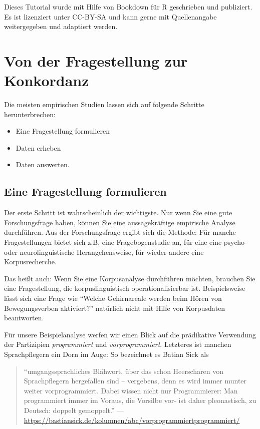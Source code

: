 \documentclass[]{article}
\providecommand{\tightlist}{%
  \setlength{\itemsep}{0pt}\setlength{\parskip}{0pt}}
\begin{document}
Dieses Tutorial wurde mit Hilfe von Bookdown für R geschrieben und
publiziert. Es ist lizenziert unter CC-BY-SA und kann gerne mit
Quellenangabe weitergegeben und adaptiert werden.

\section{Von der Fragestellung zur
Konkordanz}\label{von-der-fragestellung-zur-konkordanz}

Die meisten empirischen Studien lassen sich auf folgende Schritte
herunterbrechen:

\begin{itemize}
\tightlist
\item
  Eine Fragestellung formulieren
\item
  Daten erheben
\item
  Daten auswerten.
\end{itemize}

\subsection{Eine Fragestellung
formulieren}\label{eine-fragestellung-formulieren}

Der erste Schritt ist wahrscheinlich der wichtigste. Nur wenn Sie eine
gute Forschungsfrage haben, können Sie eine aussagekräftige empirische
Analyse durchführen. Aus der Forschungsfrage ergibt sich die Methode:
Für manche Fragestellungen bietet sich z.B. eine Fragebogenstudie an,
für eine eine psycho- oder neurolinguistische Herangehensweise, für
wieder andere eine Korpusrecherche.

Das heißt auch: Wenn Sie eine Korpusanalyse durchführen möchten,
brauchen Sie eine Fragestellung, die korpuslinguistisch
operationalisierbar ist. Beispielsweise lässt sich eine Frage wie
``Welche Gehirnareale werden beim Hören von Bewegungsverben aktiviert?''
natürlich nicht mit Hilfe von Korpusdaten beantworten.

Für unsere Beispielanalyse werfen wir einen Blick auf die prädikative
Verwendung der Partizipien \emph{programmiert} und
\emph{vorprogrammiert}. Letzteres ist manchen Sprachpflegern ein Dorn im
Auge: So bezeichnet es Batian Sick als

\begin{quote}
``umgangssprachliches Blähwort, über das schon Heerscharen von
Sprachpflegern hergefallen sind -- vergebens, denn es wird immer munter
weiter vorprogrammiert. Dabei wissen nicht nur Programmierer: Man
programmiert immer im Voraus, die Vorsilbe vor- ist daher pleonastisch,
zu Deutsch: doppelt gemoppelt.'' \hfill ---
\url{https://bastiansick.de/kolumnen/abc/vorprogrammiertprogrammiert/}
\end{quote}
\end{document}
